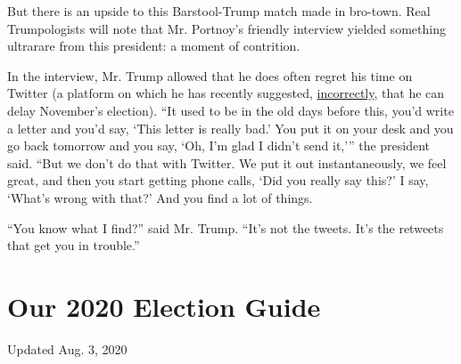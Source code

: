 But there is an upside to this Barstool-Trump match made in bro-town.
Real Trumpologists will note that Mr. Portnoy's friendly interview
yielded something ultrarare from this president: a moment of contrition.

In the interview, Mr. Trump allowed that he does often regret his time
on Twitter (a platform on which he has recently suggested,
\href{https://www.nytimes3xbfgragh.onion/2020/07/30/us/politics/trump-postpone-election.html}{incorrectly},
that he can delay November's election). ``It used to be in the old days
before this, you'd write a letter and you'd say, `This letter is really
bad.' You put it on your desk and you go back tomorrow and you say, `Oh,
I'm glad I didn't send it,''' the president said. ``But we don't do that
with Twitter. We put it out instantaneously, we feel great, and then you
start getting phone calls, `Did you really say this?' I say, `What's
wrong with that?' And you find a lot of things.

``You know what I find?'' said Mr. Trump. ``It's not the tweets. It's
the retweets that get you in trouble.''

\hypertarget{our-2020-election-guide}{%
\section{Our 2020 Election Guide}\label{our-2020-election-guide}}

Updated Aug. 3, 2020

